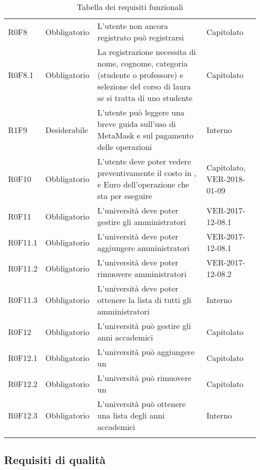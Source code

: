 \documentclass[AnalisiDeiRequisiti.tex]{subfiles}
\begin{document}
\begin{longtable}[H]{p{2.6cm}p{2.5cm}p{5cm}p{2cm}}
	R0F8 & Obbligatorio & L'utente non ancora registrato può registrarsi & Capitolato \\  
	R0F8.1 & Obbligatorio & La registrazione necessita di nome, cognome, categoria (studente o professore) e selezione del corso di laura se si tratta di uno studente & Capitolato \\  
	R1F9 & Desiderabile & L'utente può leggere una breve guida sull'uso di MetaMask e sul pagamento delle operazioni & Interno \\  	
	R0F10 & Obbligatorio & L'utente deve poter vedere preventivamente il costo in \citGloss{Gas}, \citGloss{Ether} e Euro dell'operazione che sta per eseguire & Capitolato, VER-2018-01-09 \\  	
	R0F11 & Obbligatorio & L'università deve poter gestire gli amministratori & VER-2017-12-08.1 \\
	R0F11.1 & Obbligatorio & L'università deve poter aggiungere amministratori & VER-2017-12-08.1 \\
	R0F11.2 & Obbligatorio & L'università deve poter rimuovere amministratori & VER-2017-12-08.2 \\
	R0F11.3 & Obbligatorio & L'università deve poter ottenere la lista di tutti gli amministratori & Interno \\
	R0F12& Obbligatorio & L'università può gestire gli anni accademici & Capitolato \\  
	R0F12.1 & Obbligatorio & L'università può aggiungere un \citGloss{anno accademico} & Capitolato \\  
	R0F12.2 & Obbligatorio & L'università può rimuovere un \citGloss{anno accademico} & Capitolato \\  
	R0F12.3 & Obbligatorio & L'università può ottenere una lista degli anni accademici & Interno \\ 
	\hiderowcolors
	\caption{Tabella dei requisiti funzionali}
\end{longtable}

\subsection{Requisiti di qualità}
\end{document}

